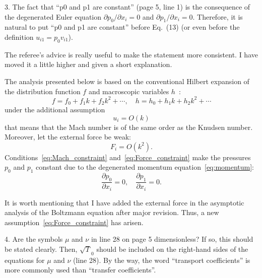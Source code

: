 \documentclass{article}
\newcommand{\pder}[2][]{\frac{\partial#1}{\partial#2}}
\newcommand{\Pder}[2][]{\partial#1/\partial#2}
\begin{document}
\begin{quoting}
3. The fact that ``p0 and p1 are constant'' (page 5, line 1) is the
consequence of the degenerated Euler equation \(\Pder[p_0]{x_i} = 0\) and
\(\Pder[p_1]{x_i} = 0\). Therefore, it is natural to put ``p0 and p1 are constant'' before
Eq.~(13) (or even before the definition \(u_{i1} = p_0v_{i1}\)).
\end{quoting}

The referee's advice is really useful to make the statement more consistent.
I have moved it a little higher and given a short explanation.

\begin{leftbar}
The analysis presented below is based on the conventional Hilbert expansion
of the distribution function \(f\) and macroscopic variables \(h\)~\cite{Hilbert1912}:
\[ f = f_0 + f_1k + f_2k^2 + \cdots, \quad h = h_0 + h_1k + h_2k^2 + \cdots \]
under the additional assumption
\begin{equation}\label{eq:Mach_constraint}
    u_i = O(k)
\end{equation}
that means that the Mach number is of the same order as the Knudsen number.
Moreover, let the external force be weak:
\begin{equation}\label{eq:Force_constraint}
    F_i = O(k^2).
\end{equation}
Conditions~\eqref{eq:Mach_constraint} and~\eqref{eq:Force_constraint} make the pressures
\(p_0\) and \(p_1\) constant due to the degenerated momentum equation~\eqref{eq:momentum}:
\begin{equation}
    \pder[p_0]{x_i} = 0, \quad \pder[p_1]{x_i} = 0.
\end{equation}
\end{leftbar}
It is worth mentioning that I have added the external force in the asymptotic analysis of
the Boltzmann equation after major revision.
Thus, a new assumption~\eqref{eq:Force_constraint} has arisen.

\begin{quoting}
4. Are the symbols \(\mu\) and \(\nu\) in line 28 on page 5 dimensionless?
If so, this should be stated clearly. Then, \(\sqrt T_0\) should be
included on the right-hand sides of the equations for \(\mu\) and
\(\nu\) (line 28). By the way, the word ``transport coefficients'' is
more commonly used than ``transfer coefficients''.
\end{quoting}
\end{document}
